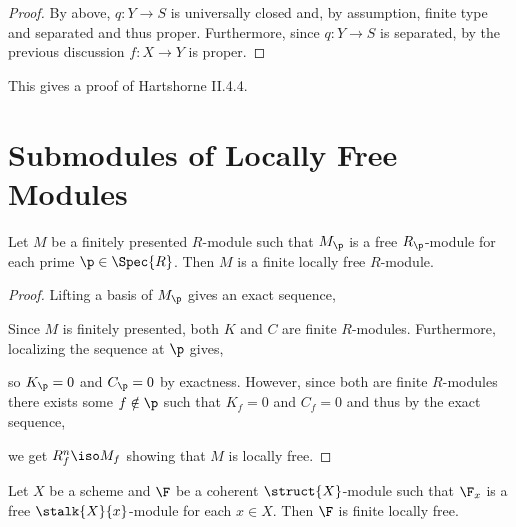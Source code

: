 \documentclass[12pt]{article}
\begin{document}
\begin{proof}
By above, $q : Y \to S$ is universally closed and, by assumption, finite type and separated and thus proper. Furthermore, since $q : Y \to S$ is separated, by the previous discussion $f : X \to Y$ is proper.
\end{proof}

\begin{rmk}
This gives a proof of Hartshorne II.4.4.
\end{rmk}


\section{Submodules of Locally Free Modules}

\begin{lemma}
Let $M$ be a finitely presented $R$-module such that $M_\p$ is a free $R_\p$-module for each prime $\p \in \Spec{R}$. Then $M$ is a finite locally free $R$-module.
\end{lemma}

\begin{proof}
Lifting a basis of $M_\p$ gives an exact sequence,
\begin{center}
\end{center}
Since $M$ is finitely presented, both $K$ and $C$ are finite $R$-modules. Furthermore, localizing the sequence at $\p$ gives,
\begin{center}
\end{center}
so $K_\p = 0$ and $C_\p = 0$ by exactness. However, since both are finite $R$-modules there exists some $f \notin \p$ such that $K_f = 0$ and $C_f = 0$ and thus by the exact sequence,
\begin{center}
\end{center}
we get $R^n_f \iso M_f$ showing that $M$ is locally free.
\end{proof}

\begin{lemma}
Let $X$ be a scheme and $\F$ be a coherent $\struct{X}$-module such that $\F_x$ is a free $\stalk{X}{x}$-module for each $x \in X$. Then $\F$ is finite locally free.
\end{lemma}
\end{document}
